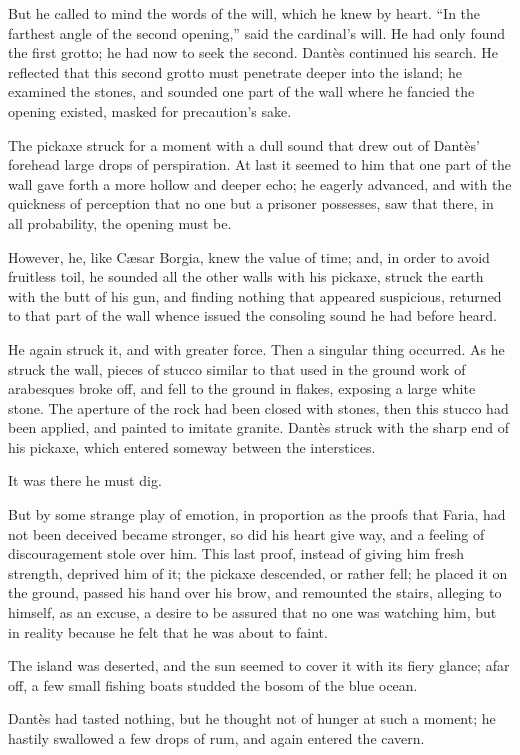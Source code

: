 But he called to mind the words of the will, which he knew by heart.
“In the farthest angle of the second opening,” said the cardinal’s
will. He had only found the first grotto; he had now to seek the
second. Dantès continued his search. He reflected that this second
grotto must penetrate deeper into the island; he examined the stones,
and sounded one part of the wall where he fancied the opening existed,
masked for precaution’s sake.

The pickaxe struck for a moment with a dull sound that drew out of
Dantès’ forehead large drops of perspiration. At last it seemed to him
that one part of the wall gave forth a more hollow and deeper echo; he
eagerly advanced, and with the quickness of perception that no one but
a prisoner possesses, saw that there, in all probability, the opening
must be.

However, he, like Cæsar Borgia, knew the value of time; and, in order
to avoid fruitless toil, he sounded all the other walls with his
pickaxe, struck the earth with the butt of his gun, and finding nothing
that appeared suspicious, returned to that part of the wall whence
issued the consoling sound he had before heard.

He again struck it, and with greater force. Then a singular thing
occurred. As he struck the wall, pieces of stucco similar to that used
in the ground work of arabesques broke off, and fell to the ground in
flakes, exposing a large white stone. The aperture of the rock had been
closed with stones, then this stucco had been applied, and painted to
imitate granite. Dantès struck with the sharp end of his pickaxe, which
entered someway between the interstices.

It was there he must dig.

But by some strange play of emotion, in proportion as the proofs that
Faria, had not been deceived became stronger, so did his heart give
way, and a feeling of discouragement stole over him. This last proof,
instead of giving him fresh strength, deprived him of it; the pickaxe
descended, or rather fell; he placed it on the ground, passed his hand
over his brow, and remounted the stairs, alleging to himself, as an
excuse, a desire to be assured that no one was watching him, but in
reality because he felt that he was about to faint.

The island was deserted, and the sun seemed to cover it with its fiery
glance; afar off, a few small fishing boats studded the bosom of the
blue ocean.

Dantès had tasted nothing, but he thought not of hunger at such a
moment; he hastily swallowed a few drops of rum, and again entered the
cavern.

